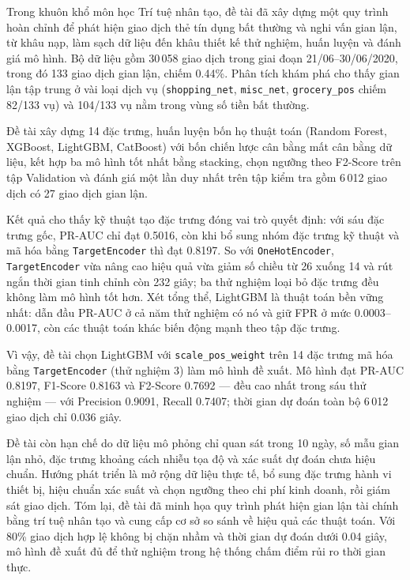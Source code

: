 Trong khuôn khổ môn học Trí tuệ nhân tạo, đề tài đã xây dựng một quy trình hoàn chỉnh để phát hiện giao dịch thẻ tín dụng bất thường và nghi vấn gian lận, từ khâu nạp, làm sạch dữ liệu đến khâu thiết kế thử nghiệm, huấn luyện và đánh giá mô hình. Bộ dữ liệu gồm 30\,058 giao dịch trong giai đoạn 21/06--30/06/2020, trong đó 133 giao dịch gian lận, chiếm 0{.}44\%. Phân tích khám phá cho thấy gian lận tập trung ở vài loại dịch vụ (\texttt{shopping\_net}, \texttt{misc\_net}, \texttt{grocery\_pos} chiếm 82/133 vụ) và 104/133 vụ nằm trong vùng số tiền bất thường.

Đề tài xây dựng 14 đặc trưng, huấn luyện bốn họ thuật toán (Random Forest, XGBoost, LightGBM, CatBoost) với bốn chiến lược cân bằng mất cân bằng dữ liệu, kết hợp ba mô hình tốt nhất bằng stacking, chọn ngưỡng theo F2-Score trên tập Validation và đánh giá một lần duy nhất trên tập kiểm tra gồm 6\,012 giao dịch có 27 giao dịch gian lận.

Kết quả cho thấy kỹ thuật tạo đặc trưng đóng vai trò quyết định: với sáu đặc trưng gốc, PR-AUC chỉ đạt 0{.}5016, còn khi bổ sung nhóm đặc trưng kỹ thuật và mã hóa bằng \texttt{TargetEncoder} thì đạt 0{.}8197. So với \texttt{OneHotEncoder}, \texttt{TargetEncoder} vừa nâng cao hiệu quả vừa giảm số chiều từ 26 xuống 14 và rút ngắn thời gian tinh chỉnh còn 232 giây; ba thử nghiệm loại bỏ đặc trưng đều không làm mô hình tốt hơn. Xét tổng thể, LightGBM là thuật toán bền vững nhất: dẫn đầu PR-AUC ở cả năm thử nghiệm có nó và giữ FPR ở mức 0{.}0003--0{.}0017, còn các thuật toán khác biến động mạnh theo tập đặc trưng.

Vì vậy, đề tài chọn LightGBM với \texttt{scale\_pos\_weight} trên 14 đặc trưng mã hóa bằng \texttt{TargetEncoder} (thử nghiệm 3) làm mô hình đề xuất. Mô hình đạt PR-AUC 0{.}8197, F1-Score 0{.}8163 và F2-Score 0{.}7692 --- đều cao nhất trong sáu thử nghiệm --- với Precision 0{.}9091, Recall 0{.}7407; thời gian dự đoán toàn bộ 6\,012 giao dịch chỉ 0{.}036 giây.

Đề tài còn hạn chế do dữ liệu mô phỏng chỉ quan sát trong 10 ngày, số mẫu gian lận nhỏ, đặc trưng khoảng cách nhiễu tọa độ và xác suất dự đoán chưa hiệu chuẩn. Hướng phát triển là mở rộng dữ liệu thực tế, bổ sung đặc trưng hành vi thiết bị, hiệu chuẩn xác suất và chọn ngưỡng theo chi phí kinh doanh, rồi giám sát giao dịch. Tóm lại, đề tài đã minh họa quy trình phát hiện gian lận tài chính bằng trí tuệ nhân tạo và cung cấp cơ sở so sánh về hiệu quả các thuật toán. Với 80\% giao dịch hợp lệ không bị chặn nhầm và thời gian dự đoán dưới 0{.}04 giây, mô hình đề xuất đủ để thử nghiệm trong hệ thống chấm điểm rủi ro thời gian thực.
